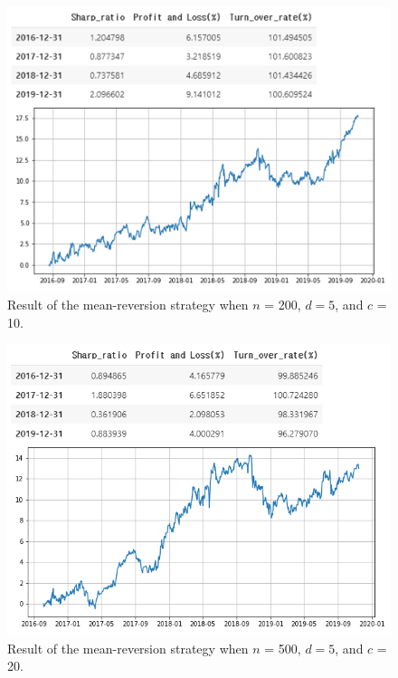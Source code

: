\documentclass[11pt]{article}
\begin{document}
\begin{figure}
    \centering
    \includegraphics[width=\textwidth/4*3]{images/bbb.png}
    \caption{Result of the mean-reversion strategy when $n$ = 200, $d = 5$, and $c$ = 10.}
    \label{deep result 1}
    \vspace*{-5mm}
\end{figure}

\begin{figure}
    \centering
    \includegraphics[width=\textwidth/4*3]{images/capt.png}
    \caption{Result of the mean-reversion strategy when $n$ = 500, $d = 5$, and $c$ = 20.}
    \label{deep result 2}
    \vspace*{-5mm}
\end{figure}
\end{document}
